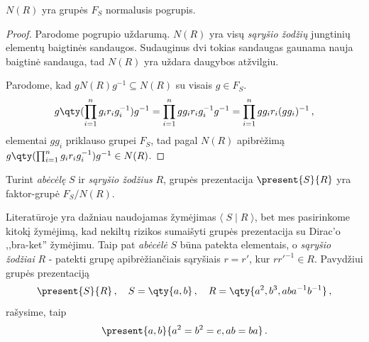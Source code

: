 \begin{proposition}
	$N(R)$ yra grupės $F_S$ normalusis pogrupis.
\end{proposition}
\begin{proof}
	Parodome pogrupio uždarumą.
	$N(R)$ yra visų \emph{sąryšio žodžių} jungtinių elementų baigtinės sandaugos.
	Sudauginus dvi tokias sandaugas gaunama nauja baigtinė sandauga,
	tad $N(R)$ yra uždara daugybos atžvilgiu.

	Parodome, kad $gN(R)g^{-1} \subseteq N(R)$ su visais $g \in F_S$.
	\begin{equation}
		g\qty(\prod_{i=1}^n g_i r_i g_i^{-1})g^{-1} 
		= \prod_{i=1}^n g g_i r_i g_i^{-1}g^{-1}
		= \prod_{i=1}^n g g_i r_i (g g_i)^{-1}
		\,,
	\end{equation}
	elementai $g g_i$ priklauso grupei $F_S$,
	tad pagal $N(R)$ apibrėžimą $g\qty(\prod_{i=1}^n g_i r_i g_i^{-1})g^{-1} \in N(R)$.
\end{proof}


\begin{definition}
	Turint \emph{abėcėlę} $S$ ir \emph{sąryšio žodžius} $R$,
	grupės prezentacija $\present{S}{R}$ yra faktor-grupė $F_S/N(R)$.
\end{definition}

\begin{remark}
	Literatūroje yra dažniau naudojamas žymėjimas $\langle\;S\;|\;R\;\rangle$,
	bet mes pasirinkome kitokį žymėjimą,
	kad nekiltų rizikos sumaišyti grupės prezentacija su Dirac'o ,,bra-ket'' žymėjimu.
	Taip pat \emph{abėcėlė} $S$ būna patekta elementais,
	o \emph{sąryšio žodžiai} $R$ - patekti grupę apibrėžiančiais sąryšiais
	$r = r'$, kur $r{r'}^{-1}\in R$.
	Pavydžiui grupės prezentaciją
	\begin{equation}
		\present{S}{R}
		\,,\quad
		S = \qty{a, b}
		\,,\quad
		R = \qty{a^2, b^3, aba^{-1}b^{-1}}
		\,,
	\end{equation}
	rašysime, taip 
	\begin{equation}
		\present{a,b}{a^2 = b^2 = e , ab = ba}
		\,.
	\end{equation}
\end{remark}



